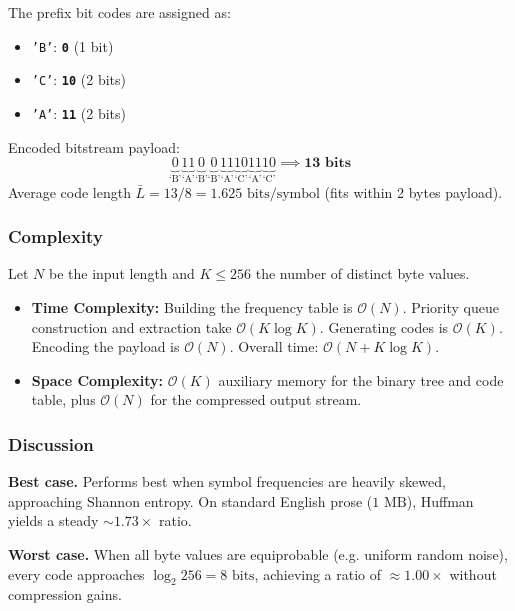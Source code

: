 \documentclass{article}
\begin{document}
The prefix bit codes are assigned as:
\begin{itemize}
    \item \texttt{'B'}: \textbf{\texttt{0}} (1 bit)
    \item \texttt{'C'}: \textbf{\texttt{10}} (2 bits)
    \item \texttt{'A'}: \textbf{\texttt{11}} (2 bits)
\end{itemize}

Encoded bitstream payload:
\begin{equation*}
\underbrace{\text{0}}_{\text{`B'}} \underbrace{\text{11}}_{\text{`A'}} \underbrace{\text{0}}_{\text{`B'}} \underbrace{\text{0}}_{\text{`B'}} \underbrace{\text{11}}_{\text{`A'}} \underbrace{\text{10}}_{\text{`C'}} \underbrace{\text{11}}_{\text{`A'}} \underbrace{\text{10}}_{\text{`C'}} \implies \mathbf{13\text{ bits}}
\end{equation*}
Average code length $\bar{L} = 13/8 = 1.625\text{ bits/symbol}$ (fits within 2 bytes payload).

\subsubsection{Complexity}
Let $N$ be the input length and $K \le 256$ the number of distinct byte values.
\begin{itemize}
    \item \textbf{Time Complexity:} Building the frequency table is $\mathcal{O}(N)$. Priority queue construction and extraction take $\mathcal{O}(K \log K)$. Generating codes is $\mathcal{O}(K)$. Encoding the payload is $\mathcal{O}(N)$. Overall time: $\mathcal{O}(N + K\log K)$.
    \item \textbf{Space Complexity:} $\mathcal{O}(K)$ auxiliary memory for the binary tree and code table, plus $\mathcal{O}(N)$ for the compressed output stream.
\end{itemize}

\subsubsection{Discussion}
\textbf{Best case.} Performs best when symbol frequencies are heavily skewed, approaching Shannon entropy. On standard English prose ($1\text{ MB}$), Huffman yields a steady $\sim\!1.73\times$ ratio.

\textbf{Worst case.} When all byte values are equiprobable (e.g. uniform random noise), every code approaches $\log_2 256 = 8\text{ bits}$, achieving a ratio of $\approx 1.00\times$ without compression gains.
\end{document}
